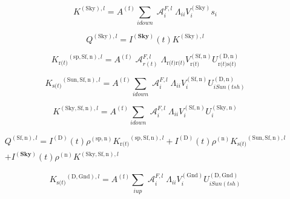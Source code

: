 \begin{equation}
{K^{{\mathrm{(Sky), }}l}} = {A^{{\mathrm{(f)}}}}\sum\limits_{i{\mathrm{ }}down} {\operatorname{\mathcal{A}}_i^{F,l}{\Lambda_{ii}}V_i^{{\mathrm{(Sky)}}}{s_i}}
\end{equation}

\begin{equation}
{Q^{{\mathrm{(Sky), }}l}} = {I^{({\mathbf{Sky}})}}(t){K^{{\mathrm{(Sky), }}l}}
\end{equation}

\begin{equation}
{K_{{\mathrm{r(}}t{\mathrm{)}}}}^{{\mathrm{(sp, Sf, n)}},l} = {A^{{\mathrm{(f)}}}}\operatorname{\mathcal{A}}_{r(t)}^{F,l}{\Lambda_{{\mathrm{ r(}}t{\mathrm{) r(}}t{\mathrm{)}}}}V_{{\mathrm{ r(}}t{\mathrm{)}}}^{{\mathrm{(Sf, n)}}}U_{{\mathrm{ r(}}t{\mathrm{) s(}}t{\mathrm{)}}}^{{\mathrm{(D,n)}}}
\end{equation}

\begin{equation}
{K_{{\mathrm{s(}}t{\mathrm{)}}}}^{{\mathrm{(Sun, Sf, n)}},l} = {A^{{\mathrm{(f)}}}}\sum\limits_{i{\mathrm{ }}down} {\operatorname{\mathcal{A}}_i^{F,l}{\Lambda_{ii}}V_i^{{\mathrm{(Sf, n)}}}U_{i{\mathrm{ }}Sun(tsh)}^{{\mathrm{(D,n)}}}}
\end{equation}

\begin{equation}
{K^{{\mathrm{(Sky, Sf, n)}},l}} = {A^{{\mathrm{(f)}}}}\sum\limits_{i{\mathrm{ }}down} {\operatorname{\mathcal{A}}_i^{F,l}{\Lambda_{ii}}V_i^{{\mathrm{(Sf, n)}}}U_i^{{\mathrm{(Sky, n)}}}}
\end{equation}

\begin{equation}
\begin{array}{c}{Q^{{\mathrm{(Sf,n)}},l}} = {I^{{\mathrm{(D)}}}}(t){\rho ^{{\mathrm{(sp, n)}}}}{K_{{\mathrm{r(}}t{\mathrm{)}}}}^{{\mathrm{(sp, Sf, n)}},l} + {I^{{\mathrm{(D)}}}}(t){\rho ^{{\mathrm{(n)}}}}{K_{{\mathrm{s(}}t{\mathrm{)}}}}^{{\mathrm{(Sun, Sf, n)}},l}\\ + {I^{({\mathbf{Sky}})}}(t){\rho ^{{\mathrm{(n)}}}}{K^{{\mathrm{(Sky, Sf, n)}},l}}\end{array}
\end{equation}

\begin{equation}
{K_{{\mathrm{s(}}t{\mathrm{)}}}}^{{\mathrm{(D, Gnd)}},l} = {A^{{\mathrm{(f)}}}}\sum\limits_{i{\mathrm{ }}up} {\operatorname{\mathcal{A}}_i^{F,l}{\Lambda_{ii}}V_i^{{\mathrm{(Gnd)}}}U_{i{\mathrm{ }}Sun(tsh)}^{{\mathrm{(D, Gnd)}}}}
\end{equation}

